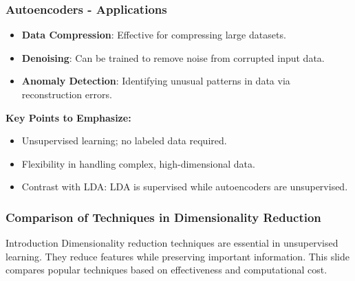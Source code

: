 \documentclass[aspectratio=169]{beamer}
\begin{document}
\begin{frame}[fragile]
    \frametitle{Autoencoders - Applications}
    \begin{itemize}
        \item \textbf{Data Compression}:
        Effective for compressing large datasets.
        
        \item \textbf{Denoising}:
        Can be trained to remove noise from corrupted input data.
        
        \item \textbf{Anomaly Detection}:
        Identifying unusual patterns in data via reconstruction errors.
    \end{itemize}

    \textbf{Key Points to Emphasize:}
    \begin{itemize}
        \item Unsupervised learning; no labeled data required.
        \item Flexibility in handling complex, high-dimensional data.
        \item Contrast with LDA: LDA is supervised while autoencoders are unsupervised.
    \end{itemize}
\end{frame}

\begin{frame}[fragile]
    \frametitle{Comparison of Techniques in Dimensionality Reduction}
    \begin{block}{Introduction}
        Dimensionality reduction techniques are essential in unsupervised learning. They reduce features while preserving important information. This slide compares popular techniques based on effectiveness and computational cost.
    \end{block}
\end{frame}
\end{document}
